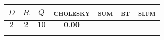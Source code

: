 
\begin{tabular}{|ccc|cccc|}
  \hline
  \abovespace\belowspace
  $D$ & $R$ & $Q$ & \textsc{cholesky} & \textsc{sum} & \textsc{bt} & \textsc{slfm}\\
\hline
  \abovespace
 $ 2 $ & $ 2 $ & $ 10 $ & $ \textbf{0.00} $ \\ 
  \\ 
  
  \belowspace \\

  \hline
\end{tabular}
